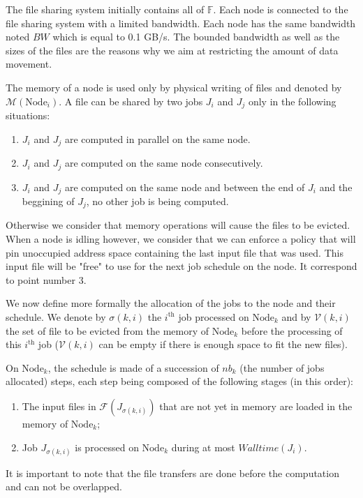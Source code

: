 \documentclass[a4paper]{article}
\newcommand{\Node}[1]{\ensuremath{\mathrm{Node}_{#1}}\xspace}
\newcommand{\inputs}{\ensuremath{\mathcal{F}}\xspace}
\newcommand{\memory}{\ensuremath{\mathcal{M}}\xspace}
\newcommand{\bandwidth}{\mathit{BW}\xspace}
\newcommand{\walltime}{\mathit{Walltime}\xspace}
\newcommand{\fileset}{\ensuremath{\mathbb{F}}\xspace}
\newcommand{\evict}{\ensuremath{\mathcal{V}}\xspace}
\begin{document}
The file sharing system initially contains all of $\fileset$.
Each node is connected to the file sharing system with a limited bandwidth.
Each node has the same bandwidth noted $\bandwidth$ which is equal to 0.1 GB/s.
The bounded bandwidth as well as the sizes of the files are the reasons why
we aim at restricting the amount of data movement.

The memory of a node is used only by physical writing of files and denoted by $\memory(\Node{i})$.
A file can be shared by two jobs $J_i$ and $J_j$ only in the following situations:
\begin{enumerate}
	\item $J_i$ and $J_j$ are computed in parallel on the same node.
	\item $J_i$ and $J_j$ are computed on the same node consecutively.
	\item $J_i$ and $J_j$ are computed on the same node and between the end of $J_i$ and the beggining of $J_j$, no other job is being computed.
\end{enumerate}
Otherwise we consider that memory operations will cause the files to be evicted.
When a node is idling however, we consider that we can enforce a policy that will
pin unoccupied address space containing the last input file that was used.
This input file will be "free" to use for the next job schedule on the node. It correspond to point number 3.

We now define more formally the allocation of the jobs to the node and
their schedule.
We denote by $\sigma(k,i)$ the $i^\text{th}$ job
processed on $\Node{k}$ and by $\evict(k,i)$ the set of file to
be evicted from the memory of $\Node{k}$ before the processing
of this $i^\text{th}$ job ($\evict(k,i)$ can be empty if there is enough space to fit the new files).

On $\Node{k}$, the schedule is made of a
succession of $\mathit{nb}_k$ (the number of jobs allocated) steps, each step being composed of the
following stages (in this order):
\begin{enumerate}
\item The input files in $\inputs(J_{\sigma(k,i)})$ that are not yet in memory are loaded in the memory of $\Node{k}$;
\item Job $J_{\sigma(k,i)}$ is processed on $\Node{k}$ during at most $\walltime(J_i)$.
\end{enumerate}
It is important to note that the file transfers are done before the computation and can not be overlapped.
\end{document}
